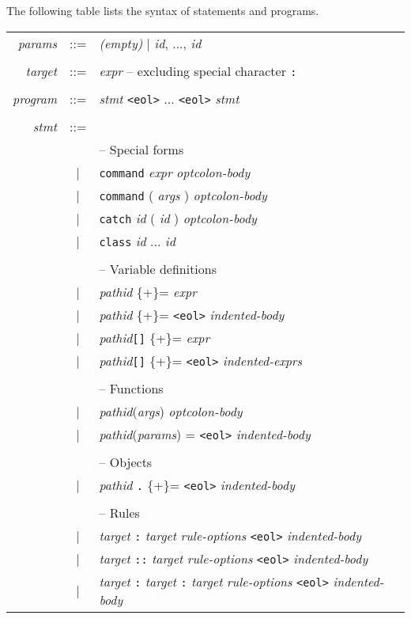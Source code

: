 The following table lists the syntax of statements and programs.

\begin{tabular}{rcl}
\emph{params} & ::= & \emph{(empty)} | \emph{id}, ..., \emph{id}\\
\\
\emph{target} & ::= & \emph{expr} -- excluding special character \verb+:+\\
\\
\emph{program} & ::= & \emph{stmt} \verb+<eol>+ ... \verb+<eol>+ \emph{stmt}\\
\\
\emph{stmt} & ::= &\\
&   & -- Special forms\\
& | & \texttt{command} \emph{expr} \emph{optcolon-body}\\
& | & \texttt{command} ( \emph{args} ) \emph{optcolon-body}\\
& | & \texttt{catch} \emph{id} ( \emph{id} ) \emph{optcolon-body}\\
& | & \texttt{class} \emph{id} ... \emph{id}\\
\\
&   & -- Variable definitions\\
& | & \emph{pathid} \{+\}= \emph{expr}\\
& | & \emph{pathid} \{+\}= \verb+<eol>+ \emph{indented-body}\\
& | & \emph{pathid}\verb+[]+ \{+\}= \emph{expr}\\
& | & \emph{pathid}\verb+[]+ \{+\}= \verb+<eol>+ \emph{indented-exprs}\\
\\
&   & -- Functions\\
& | & \emph{pathid}(\emph{args}) \emph{optcolon-body}\\
& | & \emph{pathid}(\emph{params}) = \verb+<eol>+ \emph{indented-body}\\
\\
&   & -- Objects\\
& | & \emph{pathid} \verb+.+ \{+\}= \verb+<eol>+ \emph{indented-body}\\
\\
&   & -- Rules\\
& | & \emph{target} \texttt{:} \emph{target} \emph{rule-options} \verb+<eol>+ \emph{indented-body}\\
& | & \emph{target} \texttt{::} \emph{target} \emph{rule-options} \verb+<eol>+ \emph{indented-body}\\
& | & \emph{target} \texttt{:} \emph{target} \texttt{:} \emph{target} \emph{rule-options} \verb+<eol>+ \emph{indented-body}\\

\end{tabular}
